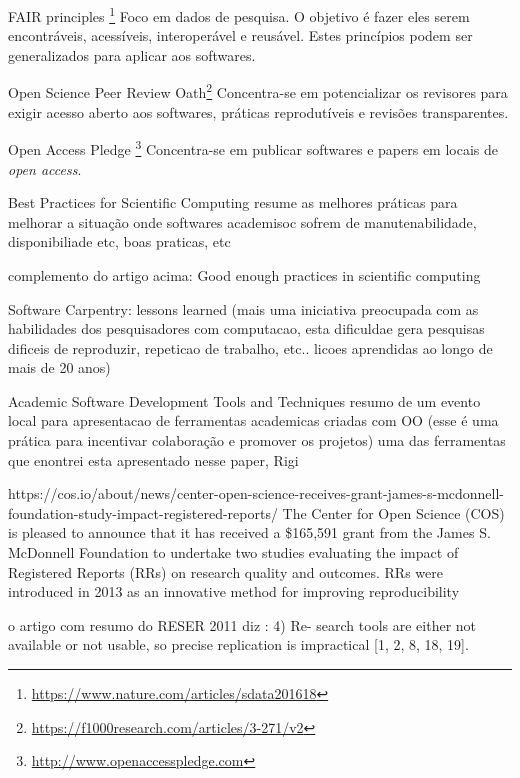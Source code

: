 FAIR principles \cite{wilkinson2016fair}\footnote{\url{https://www.nature.com/articles/sdata201618}}
Foco em dados de pesquisa. O objetivo é fazer eles serem encontráveis,
acessíveis, interoperável e reusável. Estes princípios podem ser
generalizados para aplicar aos softwares.

Open Science Peer Review Oath\footnote{\url{https://f1000research.com/articles/3-271/v2}}
Concentra-se em potencializar os revisores para exigir acesso aberto aos
softwares, práticas reprodutíveis e revisões transparentes.

Open Access Pledge \cite{holcombe2011openaccess}\footnote{\url{http://www.openaccesspledge.com}}
Concentra-se em publicar softwares e papers em locais de {\it open access}.

Best Practices for Scientific Computing \cite{wilson2014best}
resume as melhores práticas para melhorar a situação onde softwares
academisoc sofrem de manutenabilidade, disponibiliade etc, boas praticas, etc

complemento do artigo acima: 
Good enough practices in scientific computing \cite{wilson2017good}

Software Carpentry: lessons learned \cite{wilson2014software}
(mais uma iniciativa preocupada com as habilidades dos pesquisadores
com computacao, esta dificuldae gera pesquisas dificeis de reproduzir,
repeticao de trabalho, etc.. licoes aprendidas ao longo de mais de 20 anos)

Academic Software Development Tools and Techniques
resumo de um evento local para apresentacao de ferramentas academicas criadas com OO
(esse é uma prática para incentivar colaboração e promover os projetos)
uma das ferramentas que enontrei esta apresentado nesse paper, Rigi

https://cos.io/about/news/center-open-science-receives-grant-james-s-mcdonnell-foundation-study-impact-registered-reports/
The Center for Open Science (COS) is pleased to announce that it has received a
\$165,591 grant from the James S. McDonnell Foundation to undertake two studies
evaluating the impact of Registered Reports (RRs) on research quality and
outcomes. RRs were introduced in 2013 as an innovative method for improving
reproducibility

o artigo com resumo do RESER 2011 diz \cite{knutson2010report}:
4) Re-
search tools are either not available or not usable, so precise
replication is impractical [1, 2, 8, 18, 19].

